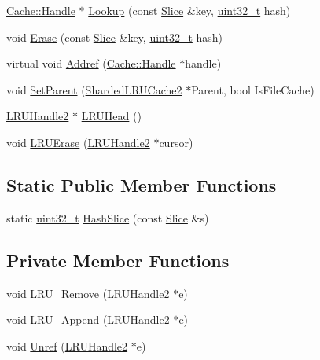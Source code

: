 \begin{DoxyCompactItemize}
\item 
\hyperlink{structleveldb_1_1_cache_1_1_handle}{Cache\+::\+Handle} $\ast$ \hyperlink{classleveldb_1_1_l_r_u_cache2_ac50368a1379879a959981ed8e16a0e64}{Lookup} (const \hyperlink{classleveldb_1_1_slice}{Slice} \&key, \hyperlink{stdint_8h_a435d1572bf3f880d55459d9805097f62}{uint32\+\_\+t} hash)
\item 
void \hyperlink{classleveldb_1_1_l_r_u_cache2_adb8d5602f58b868f9140b24cbd8c870d}{Erase} (const \hyperlink{classleveldb_1_1_slice}{Slice} \&key, \hyperlink{stdint_8h_a435d1572bf3f880d55459d9805097f62}{uint32\+\_\+t} hash)
\item 
virtual void \hyperlink{classleveldb_1_1_l_r_u_cache2_abe8243ced4c98732b572a1f44c2718f0}{Addref} (\hyperlink{structleveldb_1_1_cache_1_1_handle}{Cache\+::\+Handle} $\ast$handle)
\item 
void \hyperlink{classleveldb_1_1_l_r_u_cache2_a27a55f5785c9d3e5c07c575804b5c38a}{Set\+Parent} (\hyperlink{classleveldb_1_1_sharded_l_r_u_cache2}{Sharded\+L\+R\+U\+Cache2} $\ast$Parent, bool Is\+File\+Cache)
\item 
\hyperlink{structleveldb_1_1_l_r_u_handle2}{L\+R\+U\+Handle2} $\ast$ \hyperlink{classleveldb_1_1_l_r_u_cache2_a0aee182933937a900894ce1e6cf2f60e}{L\+R\+U\+Head} ()
\item 
void \hyperlink{classleveldb_1_1_l_r_u_cache2_af2b3838c283eea1c2fe0729941c3bcf1}{L\+R\+U\+Erase} (\hyperlink{structleveldb_1_1_l_r_u_handle2}{L\+R\+U\+Handle2} $\ast$cursor)
\end{DoxyCompactItemize}
\subsection*{Static Public Member Functions}
\begin{DoxyCompactItemize}
\item 
static \hyperlink{stdint_8h_a435d1572bf3f880d55459d9805097f62}{uint32\+\_\+t} \hyperlink{classleveldb_1_1_l_r_u_cache2_ab79789158d53171d228c93b5e762390c}{Hash\+Slice} (const \hyperlink{classleveldb_1_1_slice}{Slice} \&s)
\end{DoxyCompactItemize}
\subsection*{Private Member Functions}
\begin{DoxyCompactItemize}
\item 
void \hyperlink{classleveldb_1_1_l_r_u_cache2_a79480e4ed22f1712cfd4a54773ee5a5a}{L\+R\+U\+\_\+\+Remove} (\hyperlink{structleveldb_1_1_l_r_u_handle2}{L\+R\+U\+Handle2} $\ast$e)
\item 
void \hyperlink{classleveldb_1_1_l_r_u_cache2_a96b27b01dffb9b6d7ae4fe6029d552e1}{L\+R\+U\+\_\+\+Append} (\hyperlink{structleveldb_1_1_l_r_u_handle2}{L\+R\+U\+Handle2} $\ast$e)
\item 
void \hyperlink{classleveldb_1_1_l_r_u_cache2_a7e5e8435a60fb70639bca79f60c7c31c}{Unref} (\hyperlink{structleveldb_1_1_l_r_u_handle2}{L\+R\+U\+Handle2} $\ast$e)
\end{DoxyCompactItemize}
